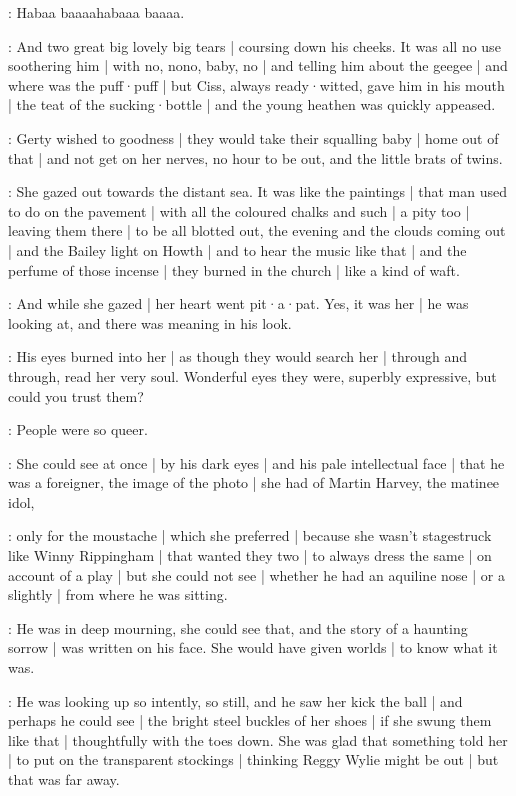 \baby:
Habaa baaaahabaaa baaaa.

:
And two great big lovely big tears |
coursing down his cheeks.
It was all no use
soothering him |
with no, nono, baby, no |%
and telling him about the geegee |
and where was the puff·puff |
but Ciss,
always ready·witted,
gave him in his mouth |
the teat of the sucking·bottle |
and the young heathen was quickly appeased.

\gertyJudgy:
Gerty wished to goodness |
they would take their squalling baby |
home out of that |
and not get on her nerves,
no hour to be out,
and the little brats of twins.

\gertyReal:
She gazed out towards the distant sea.
It was like the paintings |
that man used to do on the pavement |
with all the coloured chalks and such |
a pity too |
leaving them there |
to be all blotted out,
the evening and the clouds coming out |
and the Bailey light on Howth |
and to hear the music like that |
and the perfume of those incense |
they burned in the church |%
like a kind of waft.

\gertySex:
And while she gazed |
her heart went pit·a·pat.
Yes,
it was her |
he was looking at,
and there was meaning in his look.

\gertyNovel:
His eyes burned into her |
as though they would search her |
through and through,
read her very soul.
Wonderful eyes they were,
superbly expressive,
but could you trust them?

\gertyReal:
People were so queer.

\gertyNovel:
She could see at once |
by his dark eyes |
and his pale intellectual face |
that he was a foreigner,
the image of the photo |
she had of Martin Harvey,
the matinee idol,

\gertyReal:
only for the moustache |
which she preferred |
because she wasn't stagestruck like Winny Rippingham |
that wanted they two |
to always dress the same |
on account of a play |
but she could not see |%
whether he had an aquiline nose |
or a slightly  |
from where he was sitting.

\gertyNovel:
He was in deep mourning,
she could see that,
and the story of a haunting sorrow |
was written on his face.
She would have given worlds |
to know what it was.

\gertySex:
He was looking up so intently,
so still,
and he saw her kick the ball |
and perhaps he could see |
the bright steel buckles of her shoes |
if she swung them like that |
thoughtfully with the toes down.
She was glad that something told her |
to put on the transparent stockings |
thinking Reggy Wylie might be out |
but that was far away.

